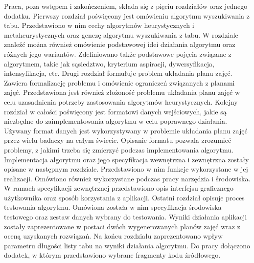 Praca, poza wstępem i zakończeniem, składa się z pięciu rozdziałów oraz jednego dodatku. Pierwszy rozdział poświęcony jest omówieniu algorytmu wyszukiwania z tabu. Przedstawiono w nim cechy algorytmów heurystycznych i metaheurystycznych oraz genezę algorytmu wyszukiwania z tabu. W rozdziale znaleźć można również omówienie podstawowej idei działania algorytmu oraz różnych jego wariantów. Zdefiniowano także podstawowe pojęcia związane z algorytmem, takie jak sąsiedztwo, kryterium aspiracji, dywersyfikacja, intensyfikacja, etc. Drugi rozdział formułuje problem układania planu zajęć. Zawiera formalizację problemu i omówienie ograniczeń związanych z planami zajęć. Przedstawiona jest również złożoność problemu układania planu zajęć w celu uzasadnienia potrzeby zastosowania algorytmów heurystycznych. Kolejny rozdział w całości poświęcony jest formatowi danych wejściowych, jakie są niezbędne do zaimplementowania algorytmu w celu poprawnego działania. Używany format danych jest wykorzystywany w problemie układania planu zajęć przez wielu badaczy na całym świecie. Opisanie formatu pozwala zrozumieć problemy, z jakimi trzeba się zmierzyć podczas implementowania algorytmu. Implementacja algorytmu oraz jego specyfikacja wewnętrzna i zewnętrzna zostały opisane w następnym rozdziale. Przedstawiono w nim funkcje wykorzystane w jej realizacji. Omówiono również wykorzystane podczas pracy narzędzia i środowiska. W ramach specyfikacji zewnętrznej przedstawiono opis interfejsu graficznego użytkownika oraz sposób korzystania z aplikacji. Ostatni rozdział opisuje proces testowania algorytmu. Omówiona została w nim specyfikacja środowiska testowego oraz zestaw danych wybrany do testowania. Wyniki działania aplikacji zostały zaprezentowane w postaci dwóch wygenerowanych planów zajęć wraz z oceną uzyskanych rozwiązań. Na końcu rozdziału zaprezentowano wpływ parametru długości listy tabu na wyniki działania algorytmu. Do pracy dołączono dodatek, w którym przedstawiono wybrane fragmenty kodu źródłowego.
